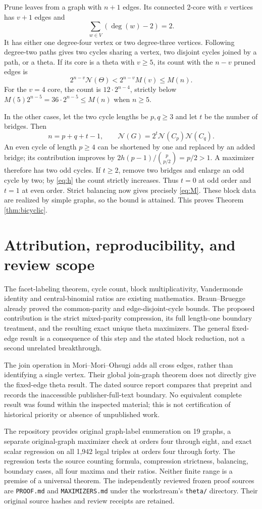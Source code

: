 \documentclass[11pt]{article}
\theoremstyle{remark}
\newcommand{\Th}{\Theta}
\newcommand{\N}{\mathcal N}
\begin{document}
Prune leaves from a graph with $n+1$ edges. Its connected 2-core with
$v$ vertices has $v+1$ edges and
\[
 \sum_{w\in V}(\deg(w)-2)=2.
\]
It has either one degree-four vertex or two degree-three vertices.
Following degree-two paths gives two cycles sharing a vertex, two
disjoint cycles joined by a path, or a theta. If its core is a theta
with $v\ge5$, its count with the $n-v$ pruned edges is
\[
 2^{n-v}\N(\Th)<2^{n-v}M(v)\le M(n).
\]
For the $v=4$ core, the count is $12\cdot2^{n-4}$, strictly below
$M(5)2^{n-5}=36\cdot2^{n-5}\le M(n)$ when $n\ge5$.

In the other cases, let the two cycle lengths be $p,q\ge3$ and let
$t$ be the number of bridges. Then
\[
 n=p+q+t-1,\qquad \N(G)=2^t\N(C_p)\N(C_q).
\]
An even cycle of length $p\ge4$ can be shortened by one and replaced
by an added bridge; its contribution improves by
$2h(p-1)/\binom p{p/2}=p/2>1$. A maximizer therefore has two odd cycles.
If $t\ge2$, remove two bridges and enlarge an odd cycle by two; by
\eqref{eq:h} the count strictly increases. Thus $t=0$ at odd order
and $t=1$ at even order. Strict balancing now gives precisely
\eqref{eq:M}. These block data are realized by simple graphs, so the
bound is attained. This proves Theorem \ref{thm:bicyclic}.

\section{Attribution, reproducibility, and review scope}
The facet-labeling theorem, cycle count, block multiplicativity,
Vandermonde identity and central-binomial ratios are existing mathematics.
Braun--Bruegge already proved the common-parity and edge-disjoint-cycle
bounds. The proposed contribution is the strict mixed-parity compression,
its full length-one boundary treatment, and the resulting exact unique
theta maximizers. The general fixed-edge result is a consequence of this
step and the stated block reduction, not a second unrelated breakthrough.

The join operation in Mori--Mori--Ohsugi \cite{MMO} adds all cross edges,
rather than identifying a single vertex. Their global join-graph theorem
does not directly give the fixed-edge theta result. The dated source
report compares that preprint and records the inaccessible
publisher-full-text boundary. No equivalent complete result was found
within the inspected material; this is not certification of historical
priority or absence of unpublished work.

The repository provides original graph-label enumeration on 19 graphs,
a separate original-graph maximizer check at orders four through eight,
and exact scalar regression on all 1,942 legal triples at orders four
through forty. The regression tests the source counting formula,
compression strictness, balancing, boundary cases, all four maxima and
their ratios. Neither finite range is a premise of a universal theorem.
The independently reviewed frozen proof sources are \texttt{PROOF.md}
and \texttt{MAXIMIZERS.md} under the workstream's \texttt{theta/}
directory. Their original source hashes and review receipts are retained.
\end{document}
